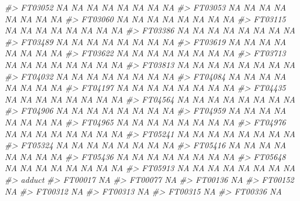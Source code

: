\documentclass[
]{article}
\newenvironment{Shaded}{\begin{snugshade}}{\end{snugshade}}
\newcommand{\CommentTok}[1]{\textcolor[rgb]{0.56,0.35,0.01}{\textit{#1}}}
\begin{document}
\begin{Shaded}
\begin{Highlighting}[]
\CommentTok{#> FT03052          NA       NA      NA        NA       NA       NA    NA    NA}
\CommentTok{#> FT03053          NA       NA      NA        NA       NA       NA    NA    NA}
\CommentTok{#> FT03060          NA       NA      NA        NA       NA       NA    NA    NA}
\CommentTok{#> FT03115          NA       NA      NA        NA       NA       NA    NA    NA}
\CommentTok{#> FT03386          NA       NA      NA        NA       NA       NA    NA    NA}
\CommentTok{#> FT03489          NA       NA      NA        NA       NA       NA    NA    NA}
\CommentTok{#> FT03619          NA       NA      NA        NA       NA       NA    NA    NA}
\CommentTok{#> FT03622          NA       NA      NA        NA       NA       NA    NA    NA}
\CommentTok{#> FT03713          NA       NA      NA        NA       NA       NA    NA    NA}
\CommentTok{#> FT03813          NA       NA      NA        NA       NA       NA    NA    NA}
\CommentTok{#> FT04032          NA       NA      NA        NA       NA       NA    NA    NA}
\CommentTok{#> FT04084          NA       NA      NA        NA       NA       NA    NA    NA}
\CommentTok{#> FT04197          NA       NA      NA        NA       NA       NA    NA    NA}
\CommentTok{#> FT04435          NA       NA      NA        NA       NA       NA    NA    NA}
\CommentTok{#> FT04564          NA       NA      NA        NA       NA       NA    NA    NA}
\CommentTok{#> FT04906          NA       NA      NA        NA       NA       NA    NA    NA}
\CommentTok{#> FT04959          NA       NA      NA        NA       NA       NA    NA    NA}
\CommentTok{#> FT04965          NA       NA      NA        NA       NA       NA    NA    NA}
\CommentTok{#> FT04976          NA       NA      NA        NA       NA       NA    NA    NA}
\CommentTok{#> FT05241          NA       NA      NA        NA       NA       NA    NA    NA}
\CommentTok{#> FT05324          NA       NA      NA        NA       NA       NA    NA    NA}
\CommentTok{#> FT05416          NA       NA      NA        NA       NA       NA    NA    NA}
\CommentTok{#> FT05436          NA       NA      NA        NA       NA       NA    NA    NA}
\CommentTok{#> FT05648          NA       NA      NA        NA       NA       NA    NA    NA}
\CommentTok{#> FT05913          NA       NA      NA        NA       NA       NA    NA    NA}
\CommentTok{#>         adduct}
\CommentTok{#> FT00017     NA}
\CommentTok{#> FT00077     NA}
\CommentTok{#> FT00136     NA}
\CommentTok{#> FT00152     NA}
\CommentTok{#> FT00312     NA}
\CommentTok{#> FT00313     NA}
\CommentTok{#> FT00315     NA}
\CommentTok{#> FT00336     NA}

\end{Highlighting}
\end{Shaded}
\end{document}

